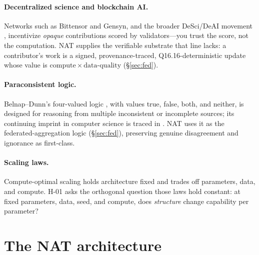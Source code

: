 \documentclass[11pt]{article}
\newcommand{\Qff}{Q16.16}
\begin{document}
\paragraph{Decentralized science and blockchain AI.}
Networks such as Bittensor and Gensyn, and the broader DeSci/DeAI movement \citep{wang2024sok},
incentivize \emph{opaque} contributions scored by validators---you trust the score, not the
computation. NAT supplies the verifiable substrate that line lacks: a contributor's work is a signed,
provenance-traced, \Qff{}-deterministic update whose value is
$\mathrm{compute}\times\mathrm{data\text{-}quality}$ (\S\ref{sec:fed}).

\paragraph{Paraconsistent logic.}
Belnap--Dunn's four-valued logic \citep{belnap1977useful}, with values true, false, both, and
neither, is designed for reasoning from multiple inconsistent or incomplete sources; its continuing
imprint in computer science is traced in \citet{jakl2025four}. NAT uses it as the
federated-aggregation logic (\S\ref{sec:fed}), preserving genuine disagreement and ignorance as
first-class.

\paragraph{Scaling laws.}
Compute-optimal scaling \citep{hoffmann2022training,kaplan2020scaling} holds architecture fixed and
trades off parameters, data, and compute. H-01 asks the orthogonal question those laws hold constant:
at fixed parameters, data, seed, and compute, does \emph{structure} change capability per parameter?

\section{The NAT architecture}\label{sec:arch}
\end{document}
